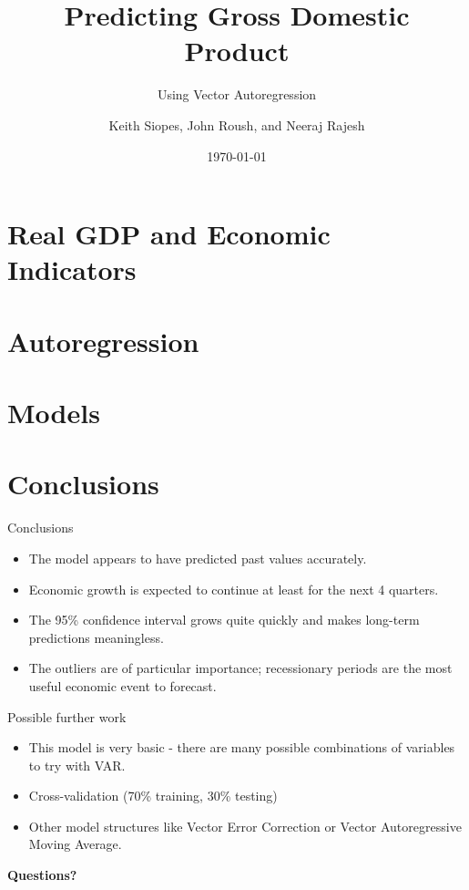\documentclass[aspectratio=169]{beamer}
\title{Predicting Gross Domestic Product}
\subtitle{Using Vector Autoregression}
\date{\today}
\author{Keith Siopes, John Roush, and Neeraj Rajesh}
\institute{Central Michigan University}
\begin{document}
    
    \maketitle

    \section{Real GDP and Economic Indicators}
    

    \section{Autoregression}
    
    
    \section{Models}
    
    
    \section{Conclusions}    
        \begin{frame}{Conclusions}
        \begin{itemize}
        \item The model appears to have predicted past values accurately.
        \item Economic growth is expected to continue at least for the next 4 quarters.
        \item The 95\% confidence interval grows quite quickly and makes long-term predictions meaningless.
        \item The outliers are of particular importance; recessionary periods
            are the most useful economic event to forecast.
        \end{itemize}
    \end{frame}
    
    \begin{frame}{Possible further work}
        \begin{itemize}
        \item This model is very basic - there are many possible combinations
            of variables to try with VAR.
        \item Cross-validation (70\% training, 30\% testing)
        \item Other model structures like Vector Error Correction or 
            Vector Autoregressive Moving Average.
        \end{itemize}
    \end{frame}
    
    \begin{frame}
        \begin{center} \huge \bf Questions? \end{center}
    \end{frame}
\end{document}
